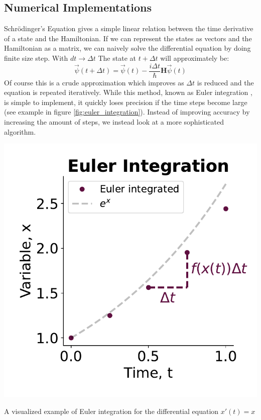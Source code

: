 \subsection{Numerical Implementations}\label{sec:numerical_implementations}
Schrödinger's Equation gives a simple linear relation between the time derivative of a state and the Hamiltonian. If we can represent the states as vectors and the Hamiltonian as a matrix, we can naively solve the differential equation by doing finite size step. With $dt\to\Delta t$ The state at $t+\Delta t$ will approximately be:
\begin{equation}
    \Vec{\psi}(t + \Delta t) =  \Vec{\psi}(t) - \frac{i\Delta t}{\hbar}\boldsymbol{H} \Vec{\psi}(t)
\end{equation}
Of course this is a crude approximation which improves as $\Delta t$ is reduced and the equation is repeated iteratively. While this method, known as Euler integration \cite{butcher_numerical_2000}, is simple to implement, it quickly loses precision if the time steps become large (see example in figure \ref{fig:euler_integration}). Instead of improving accuracy by increasing the amount of steps, we instead look at a more sophisticated algorithm.
\begin{marginfigure}
    \centering
    \includegraphics[]{Figs/Theory/euler_integration.pdf}
    \caption{A visualized example of Euler integration for the differential equation $x'(t) = x$}
    \label{fig:euler_integration}
\end{marginfigure}


